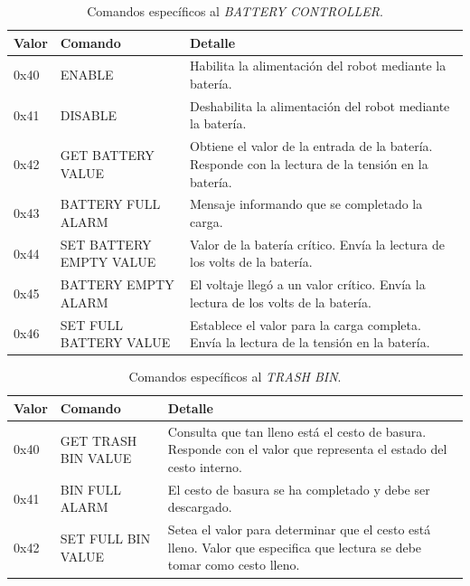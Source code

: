 \begin{table}[h]
	\begin{center}
		\begin{tabular}{|l|p{2.5cm}|p{7.5cm}|}
		\hline
		Valor & Comando & Detalle \\
		\hline
		0x40 & ENABLE & Habilita la alimentaci\'on del robot mediante la bater\'ia. \\
		\hline
		0x41 & DISABLE & Deshabilita la alimentaci\'on del robot mediante la bater\'ia. \\
		\hline
		0x42 & GET BATTERY VALUE & Obtiene el valor de la entrada de la bater\'ia.
		Responde con la lectura de la tensi\'on en la bater\'ia. \\
		\hline
		0x43 & BATTERY FULL ALARM & Mensaje informando que se completado la carga. \\
		\hline
		0x44 & SET BATTERY EMPTY VALUE & Valor de la bater\'ia cr\'itico.
		Env\'ia la lectura de los volts de la bater\'ia. \\
		\hline
		0x45 & BATTERY EMPTY ALARM & El voltaje lleg\'o a un valor cr\'itico.
		Env\'ia la lectura de los volts de la bater\'ia. \\
		\hline
		0x46 & SET FULL BATTERY VALUE & Establece el valor para la carga completa.
		Env\'ia la lectura de la tensi\'on en la bater\'ia. \\
		\hline
		\end{tabular}
		\caption{Comandos espec\'ificos al \emph{BATTERY CONTROLLER}. }
		\label{hT_comm_comandos_bateria}
	\end{center}
\end{table}

\begin{table}[h]
	\begin{center}
		\begin{tabular}{|l|p{2.5cm}|p{7.5cm}|}
		\hline
		Valor & Comando & Detalle \\
		\hline
		0x40 & GET TRASH BIN VALUE & Consulta que tan lleno est\'a el cesto de basura.
		Responde con el valor que representa el estado del cesto interno. \\
		\hline
		0x41 & BIN FULL ALARM & El cesto de basura se ha completado y debe ser descargado. \\
		\hline
		0x42 & SET FULL BIN VALUE & Setea el valor para determinar que el cesto est\'a lleno.
		Valor que especifica que lectura se debe tomar como cesto lleno.\\
		\hline
		\end{tabular}
		\caption{Comandos espec\'ificos al \emph{TRASH BIN}. }
		\label{hT_comm_comandos_basura}
	\end{center}
\end{table}

